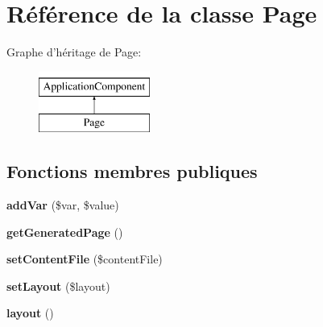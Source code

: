 \hypertarget{class_library_1_1_page}{\section{Référence de la classe Page}
\label{class_library_1_1_page}
}
Graphe d'héritage de Page\+:\begin{figure}[H]
\begin{center}
\leavevmode
\includegraphics[height=2.000000cm]{class_library_1_1_page}
\end{center}
\end{figure}
\subsection*{Fonctions membres publiques}
\begin{DoxyCompactItemize}
\item 
\hypertarget{class_library_1_1_page_a4e9ea9cadecaf94b5674165733693645}{{\bfseries add\+Var} (\$var, \$value)}\label{class_library_1_1_page_a4e9ea9cadecaf94b5674165733693645}

\item 
\hypertarget{class_library_1_1_page_a6e994460d6963e485cb10fe0bc0d2297}{{\bfseries get\+Generated\+Page} ()}\label{class_library_1_1_page_a6e994460d6963e485cb10fe0bc0d2297}

\item 
\hypertarget{class_library_1_1_page_a72c6dbcb66d934f5804ff162300b80d9}{{\bfseries set\+Content\+File} (\$content\+File)}\label{class_library_1_1_page_a72c6dbcb66d934f5804ff162300b80d9}

\item 
\hypertarget{class_library_1_1_page_a702b3376618a26e6c02c05bae65c6b9e}{{\bfseries set\+Layout} (\$layout)}\label{class_library_1_1_page_a702b3376618a26e6c02c05bae65c6b9e}

\item 
\hypertarget{class_library_1_1_page_a0e9447221830f8629717836bd933a164}{{\bfseries layout} ()}\label{class_library_1_1_page_a0e9447221830f8629717836bd933a164}

\end{DoxyCompactItemize}
